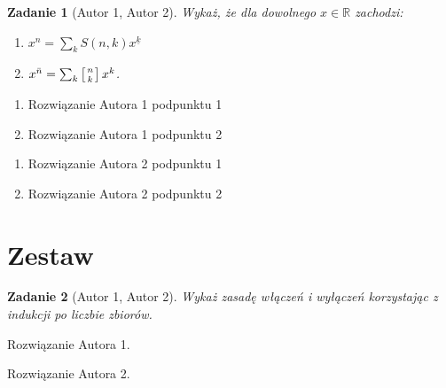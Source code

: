 \documentclass{mwart}
\newtheorem{zad}{Zadanie}[section]
\begin{document}
\begin{zad}[Autor 1, Autor 2]
    Wykaż, że dla dowolnego $x \in \mathbb{R}$ zachodzi:
    \begin{enumerate}
        \item $x^n = \sum_{k}S(n,k) x^{\underline{k}}$
        \item $x^{\bar{n}} = \sum_{k} \left[n \atop k \right] x^k$.
    \end{enumerate}
\end{zad}
\begin{mdframed}
    \begin{enumerate}
        \item Rozwiązanie Autora 1 podpunktu 1
        \item Rozwiązanie Autora 1 podpunktu 2
    \end{enumerate}
\end{mdframed}
\begin{mdframed}
    \begin{enumerate}
        \item Rozwiązanie Autora 2 podpunktu 1
        \item Rozwiązanie Autora 2 podpunktu 2
    \end{enumerate}
\end{mdframed}















\newpage
\section{Zestaw}          %

\begin{zad}[Autor 1, Autor 2]
    Wykaż zasadę włączeń i wyłączeń korzystając z indukcji po liczbie zbiorów.
\end{zad}
\begin{mdframed}
    Rozwiązanie Autora 1.
\end{mdframed}
\begin{mdframed}
    Rozwiązanie Autora 2.
\end{mdframed}
\end{document}
